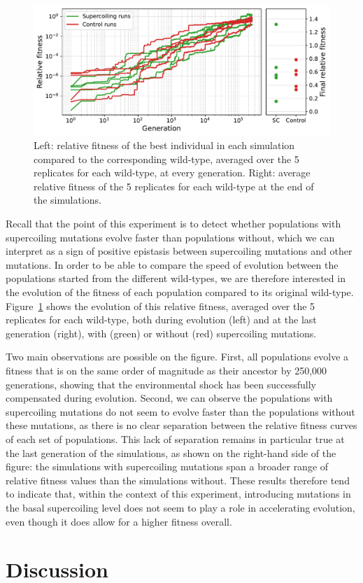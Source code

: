 \begin{figure}
\includegraphics[width=\textwidth]{epistasis/img/rel_fitness_sc_control.pdf}
\caption{Left: relative fitness of the best individual in each simulation compared to the corresponding wild-type, averaged over the 5 replicates for each wild-type, at every generation.
Right: average relative fitness of the 5 replicates for each wild-type at the end of the simulations.}
\label{fig:epistasis:rel-fitness}
\end{figure}


Recall that the point of this experiment is to detect whether populations with supercoiling mutations evolve faster than populations without, which we can interpret as a sign of positive epistasis between supercoiling mutations and other mutations.
In order to be able to compare the speed of evolution between the populations started from the different wild-types, we are therefore interested in the evolution of the fitness of each population compared to its original wild-type.
Figure~\ref{fig:epistasis:rel-fitness} shows the evolution of this relative fitness, averaged over the 5 replicates for each wild-type, both during evolution (left) and at the last generation (right), with (green) or without (red) supercoiling mutations.

Two main observations are possible on the figure.
First, all populations evolve a fitness that is on the same order of magnitude as their ancestor by 250,000 generations, showing that the environmental shock has been successfully compensated during evolution.
Second, we can observe the populations with supercoiling mutations do not seem to evolve faster than the populations without these mutations, as there is no clear separation between the relative fitness curves of each set of populations.
This lack of separation remains in particular true at the last generation of the simulations, as shown on the right-hand side of the figure: the simulations with supercoiling mutations span a broader range of relative fitness values than the simulations without.
These results therefore tend to indicate that, within the context of this experiment, introducing mutations in the basal supercoiling level does not seem to play a role in accelerating evolution, even though it does allow for a higher fitness overall.

\section{Discussion}